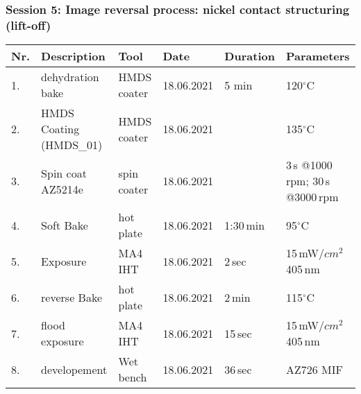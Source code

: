 \vspace{-0.1cm}
\subsubsection*{Session 5: Image reversal process: nickel contact structuring (lift-off)}     
\vspace{-0.5cm}   
\begin{table}[H]
\footnotesize
\begin{tabular}{| p{0.4cm}| p{4.0cm}| p{3.0cm}|p{2.0cm}| p{2.0cm}|p{13.5cm}|}
\hline
\textbf{Nr.}&\textbf{Description} &\textbf{Tool}& \textbf{Date}  &\textbf{Duration} & \textbf{Parameters}\\ \hline\hline
1. &dehydration bake& HMDS coater& 18.06.2021 & 5 min & 120$^{\circ}$C  \\\hline
2. &HMDS Coating (HMDS\_01)& HMDS coater& 18.06.2021 &  & 135$^{\circ}$C  \\\hline
3. &Spin coat AZ5214e & spin coater& 18.06.2021 &  & 3\,s @1000\,rpm; 30\,s @3000\,rpm  \\\hline
4. &Soft Bake & hot plate& 18.06.2021 & 1:30\,min & 95$^{\circ}$C  \\\hline
5. &Exposure & MA4 IHT& 18.06.2021 & 2\,sec & 15\,mW/$cm^2$ 405\,nm  \\\hline
6. &reverse Bake & hot plate& 18.06.2021 & 2\,min & 115$^{\circ}$C  \\\hline
7. &flood exposure & MA4 IHT& 18.06.2021 & 15\,sec & 15\,mW/$cm^2$ 405\,nm \\\hline
8. &developement & Wet bench& 18.06.2021 & 36\,sec & AZ726 MIF \\\hline
\end{tabular}
\end{table} 